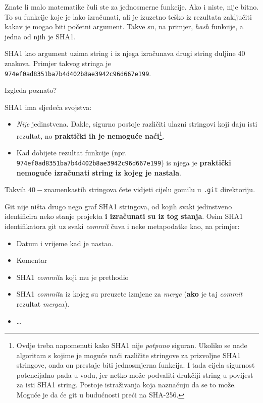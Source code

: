 Znate li malo matematike čuli ste za jednosmerne funkcije.
Ako i niste, nije bitno. 
To su funkcije koje je lako izračunati, ali je izuzetno teško iz rezultata zaključiti kakav je mogao biti početni argument.
Takve su, na primjer, \emph{hash} funkcije, a jedna od njih je SHA1.

SHA1 kao argument uzima string i iz njega izračunava drugi string duljine 40 znakova.
Primjer takvog stringa je \verb+974ef0ad8351ba7b4d402b8ae3942c96d667e199+.

Izgleda poznato?

SHA1 ima sljedeća svojstva:

\begin{itemize}
	\item \emph{Nije} jedinstvena. Dakle, sigurno postoje različiti ulazni stringovi koji daju isti rezultat, no \textbf{praktički ih je nemoguće naći}\footnote{Ovdje treba napomenuti kako SHA1 nije \emph{potpuno} siguran. Ukoliko se nađe algoritam s kojime je moguće naći različite stringove za prizvoljne SHA1 stringove, onda on prestaje biti jednosmjerna funkcija. I tada cijela sigurnost potencijalno pada u vodu, jer netko može podvaliti drukčiji string u povijest za isti SHA1 string. Postoje istraživanja koja naznačuju da se to može. Moguće je da će git u budućnosti preći na SHA-256.}. 
	\item Kad dobijete rezultat funkcije (npr. \verb+974ef0ad8351ba7b4d402b8ae3942c96d667e199+) is njega je \textbf{praktički nemoguće izračunati string iz kojeg je nastala}.
\end{itemize}

Takvih $40-$znamenkastih stringova ćete vidjeti cijelu gomilu u \verb+.git+ direktoriju.

Git nije ništa drugo nego graf SHA1 stringova, od kojih svaki jedinstveno identificira neko stanje projekta \textbf{i izračunati su iz tog stanja}.
Osim SHA1 identifikatora git uz svaki \emph{commit} čuva i neke metapodatke kao, na primjer:

\begin{itemize}
	\item Datum i vrijeme kad je nastao.
	\item Komentar
	\item SHA1 \emph{commit}a koji mu je prethodio
	\item SHA1 \emph{commit}a iz kojeg su preuzete izmjene za \emph{merge} (\textbf{ako} je taj \emph{commit} rezultat \emph{merge}a).
	\item \dots
\end{itemize}

